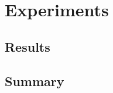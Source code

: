 \documentclass[thesis.tex]{subfiles}
\begin{document}
\chapter{Experiments} \label{chap:experiments}


\section{Results} \label{sec:C4-results}


\section{Summary} \label{sec:C4-summary}
\end{document}
